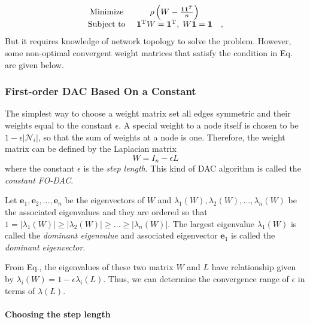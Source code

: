 \begin{equation}
\begin{array}{ccc}
\mbox{\mbox{Minimize }} & \rho\left(W-\frac{\mathbf{1}\mathbf{1}^{T}}{n}\right)\\
\mbox{Subject to } & \mathbf{1}^{\mathrm{T}}W=\mathbf{1}^{\mathrm{T}},\; W\mathbf{1}=\mathbf{1} & ,
\end{array}\label{eq: Opt. FO-DAC Problem}
\end{equation}
But it requires knowledge of network topology to solve the problem.
However, some non-optimal convergent weight matrices that satisfy
the condition in Eq. are given
below. 


\subsubsection{First-order DAC Based On a Constant}

The simplest way to choose a weight matrix set all edges symmetric
and their weights equal to the constant $\epsilon$. A special weight
to a node itself is chosen to be $1-\epsilon\left|\mathcal{N}_{i}\right|$,
so that the sum of weights at a node is one. Therefore, the weight
matrix can be defined by the Laplacian matrix 
\begin{equation}
W=I_{n}-\epsilon L\label{eq:def. const FO-DAC}
\end{equation}
where the constant $\epsilon$ is the \textit{step length}. This kind
of DAC algorithm is called the \textit{constant FO-DAC}.

Let $\mathbf{e}_{1},\mathbf{e}_{2},\ldots,\mathbf{e}_{n}$ be the
eigenvectors of $W$ and $\lambda_{1}\left(W\right),\lambda_{2}\left(W\right),\ldots,\lambda_{n}\left(W\right)$
be the associated eigenvalues and they are ordered so that $1=\left|\lambda_{1}\left(W\right)\right|\geq\left|\lambda_{2}\left(W\right)\right|\geq\ldots\geq\left|\lambda_{n}\left(W\right)\right|$.
The largest eigenvalue $\lambda_{1}\left(W\right)$ is called the
\textit{dominant eigenvalue} and associated eigenvector $\mathbf{e}_{1}$
is called the \textit{dominant eigenvector}. 

From Eq., the eigenvalues of these
two matrix $W$ and $L$ have relationship given by $\lambda_{i}\left(W\right)=1-\epsilon\lambda_{i}\left(L\right)$.
Thus, we can determine the convergence range of $\epsilon$ in terms
of $\lambda\left(L\right)$.


\paragraph*{Choosing the step length}


